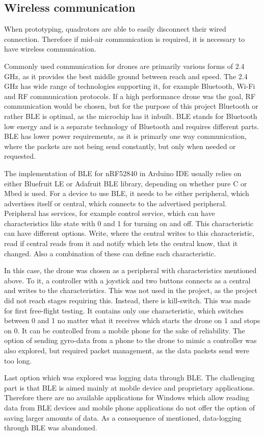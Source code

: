 \subsection{Wireless communication}
When prototyping, quadrotors are able to easily disconnect their wired connection. Therefore if mid-air communication is required, it is necessary to have wireless communication.

Commonly used communication for drones are primarily various forms of 2.4 GHz, as it provides the best middle ground between reach and speed. The 2.4 GHz has wide range of technologies supporting it, for example Bluetooth, Wi-Fi and RF communication protocols. 
If a high performance drone was the goal, RF communication would be chosen, but for the purpose of this project Bluetooth or rather BLE is optimal, as the microchip has it inbuilt. BLE stands for Bluetooth low energy and is a separate technology of Bluetooth and requires different parts. BLE has lower power requirements, as it is primarly one way communication, where the packets are not being send constantly, but only when needed or requested.

The implementation of BLE for nRF52840 in Arduino IDE usually relies on either Bluefruit LE or Adafruit BLE library, depending on whether pure C or Mbed is used.
For a device to use BLE, it needs to be either peripheral, which advertises itself or central, which connects to the advertised peripheral. Peripheral has services, for example control service, which can have characteristics like state with 0 and 1 for turning on and off.
This characteristic can have different options. Write, where the central writes to this characteristic, read if central reads from it and notify which lets the central know, that it changed. Also a combination of these can define each characteristic.

In this case, the drone was chosen as a peripheral with characteristics mentioned above. To it, a controller with a joystick and two buttons connects as a central and writes to the characteristics. This was not used in the project, as the project did not reach stages requiring this. 
Instead, there is kill-switch. This was made for first free-flight testing. It contains only one characteristic, which switches between 0 and 1 no matter what it receives which starts the drone on 1 and stops on 0. It can be controlled from a mobile phone for the sake of reliability. The option of sending gyro-data from a phone to the drone to mimic a controller was also explored, but required packet management, as the data packets send were too long.

Last option which was explored was logging data through BLE. The challenging part is that BLE is aimed mainly at mobile device and proprietary applications. Therefore there are no available applications for Windows which allow reading data from BLE devices and mobile phone applications do not offer the option of saving larger amounts of data. As a consequence of mentioned, data-logging through BLE was abandoned.